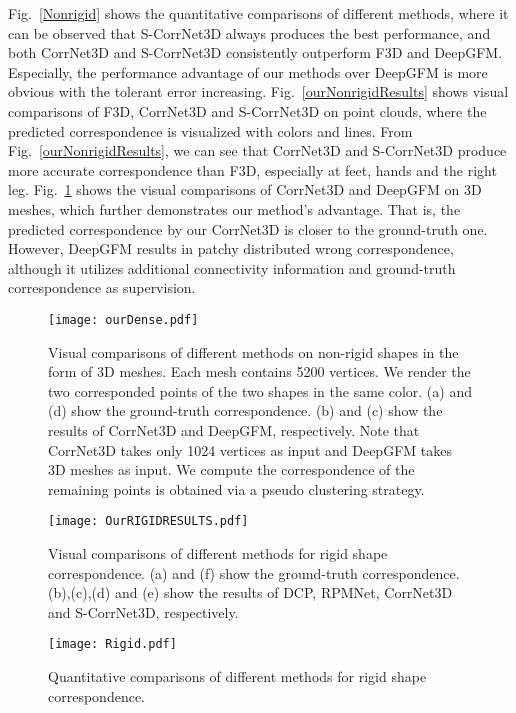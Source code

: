 \documentclass[final]{cvpr}
\begin{document}


\fi


Fig.~\ref{Nonrigid} shows the quantitative comparisons of different methods, where it can be observed that S-CorrNet3D always produces the best performance, and both CorrNet3D and S-CorrNet3D  consistently outperform 
F3D and DeepGFM. Especially, the performance advantage of our methods over DeepGFM is more obvious with the tolerant error increasing. Fig.~\ref{ourNonrigidResults} shows visual comparisons of F3D, CorrNet3D and S-CorrNet3D on point clouds, where the predicted correspondence is visualized with colors and lines. From Fig.~\ref{ourNonrigidResults}, we can see that CorrNet3D and S-CorrNet3D produce more accurate correspondence than F3D, especially  at feet, hands and the right leg. 
Fig.~\ref{Dense} shows the visual comparisons of CorrNet3D and DeepGFM on 3D meshes,  
which further demonstrates our method's advantage.
That is, the predicted correspondence by our CorrNet3D is closer to the ground-truth one. However, DeepGFM results in patchy distributed wrong correspondence,
although it utilizes additional connectivity information and ground-truth correspondence as supervision.



 \begin{figure}[t]
   \centering
   \texttt{[image: ourDense.pdf]}
   \caption{Visual comparisons of different methods on non-rigid shapes in the form of 3D meshes. Each mesh contains 5200 vertices. We render the two corresponded points of the two shapes in the same color.  (a) and (d) show the ground-truth correspondence. (b) and (c) show the results of CorrNet3D and DeepGFM, respectively. Note that CorrNet3D takes only 1024 vertices as input and DeepGFM takes 3D meshes as input. We compute the correspondence of the remaining points is obtained via a pseudo clustering strategy.  }
\label{Dense}
 \end{figure}
 
\begin{figure}[t]
  \centering
  \texttt{[image: OurRIGIDRESULTS.pdf]}
\caption{Visual comparisons of different methods for rigid shape correspondence. (a) and (f) show the ground-truth correspondence. (b),(c),(d) and (e) show the results of DCP, RPMNet, CorrNet3D and S-CorrNet3D, respectively. }
  \label{OurRIGIDRESULTS}
 \end{figure}
 
\begin{figure}[t]
   \centering
   \texttt{[image: Rigid.pdf]}
   \caption{Quantitative comparisons of different methods for rigid shape correspondence.}
     \label{Rigid}
 \end{figure}
\end{document}

